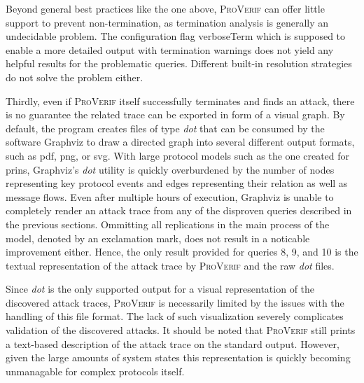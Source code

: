 Beyond general best practices like the one above, \textsc{ProVerif} can offer little support to prevent non-termination, as termination analysis is generally an undecidable problem.
The configuration flag {\sffamily verboseTerm} which is supposed to enable a more detailed output with termination warnings does not yield any helpful results for the problematic queries.
Different built-in resolution strategies do not solve the problem either.\medskip

Thirdly, even if \textsc{ProVerif} itself successfully terminates and finds an attack, there is no guarantee the related trace can be exported in form of a visual graph.
By default, the program creates files of type \textit{dot} that can be consumed by the software Graphviz to draw a directed graph into several different output formats, such as pdf, png, or svg.
With large protocol models such as the one created for \gls{prins}, Graphviz's \textit{dot} utility is quickly overburdened by the number of nodes representing key protocol events and edges representing their relation as well as message flows.
Even after multiple hours of execution, Graphviz is unable to completely render an attack trace from any of the disproven queries described in the previous sections.
Ommitting all replications in the main process of the model, denoted by an exclamation mark, does not result in a noticable improvement either.
Hence, the only result provided for queries 8, 9, and 10 is the textual representation of the attack trace by \textsc{ProVerif} and the raw \textit{dot} files.

Since \textit{dot} is the only supported output for a visual representation of the discovered attack traces, \textsc{ProVerif} is necessarily limited by the issues with the handling of this file format.
The lack of such visualization severely complicates validation of the discovered attacks.
It should be noted that \textsc{ProVerif} still prints a text-based description of the attack trace on the standard output.
However, given the large amounts of system states this representation is quickly becoming unmanagable for complex protocols itself.\medskip

